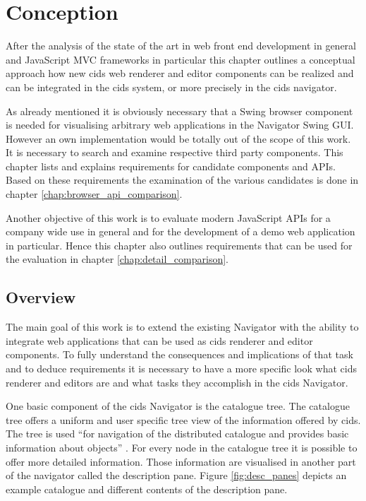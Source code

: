 \chapter{Conception}\label{chap:conception}
After the analysis of the state of the art in web front end development in general and JavaScript MVC frameworks in particular this chapter outlines a conceptual approach how new cids web renderer and editor components can be realized and can be integrated in the cids system, or more precisely in the cids navigator.

As already mentioned it is obviously necessary that a Swing browser component is needed for visualising arbitrary web applications in the Navigator Swing GUI.
However an own implementation would be totally out of the scope of this work. It is necessary to search and examine respective third party components.
This chapter lists and explains requirements for candidate components and APIs.
Based on these requirements the examination of the various candidates is done in chapter \ref{chap:browser_api_comparison}.

Another objective of this work is to evaluate modern JavaScript APIs for a company wide use in general and for the development of a demo web application in particular.
Hence this chapter also outlines requirements that can be used for the evaluation in chapter \ref{chap:detail_comparison}.

\section{Overview}

The main goal of this work is to extend the existing Navigator with the ability to integrate web applications that can be used as cids renderer and editor components.
To fully understand the consequences and implications of that task and to deduce requirements it is necessary to have a more specific look what cids renderer and editors are and what tasks they accomplish in the cids Navigator.

One basic component of the cids Navigator is the catalogue tree.
The catalogue tree offers a uniform and user specific tree view of the information offered by cids.
The tree is used \enquote{for navigation of the distributed catalogue and provides basic information about objects} \autocite{cismet-cids-readMe}.
For every node in the catalogue tree it is possible to offer more detailed information.
Those information are visualised in another part of the navigator called the description pane.
Figure \ref{fig:desc_panes} depicts an example catalogue and different contents of the description pane.

